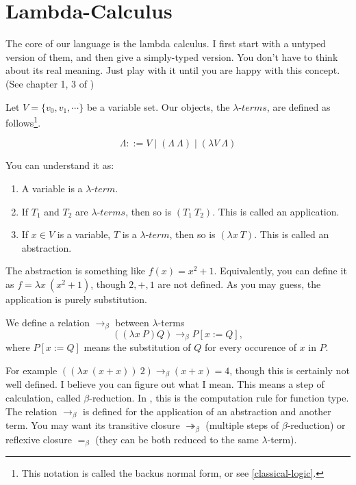 \section{Lambda-Calculus}
The core of our language is the lambda calculus. I first start with a
untyped version of them, and then give a simply-typed version. You don't
have to think about its real meaning. Just play with it until you are
happy with this concept. (See chapter 1, 3 of \cite{Curry-Howard})

Let 
$V=\{v_0, v_1, \cdots\}$ be a variable set. Our objects, the 
$\lambda$-$terms$, are defined as follows\footnote{This notation is
called the backus normal form, or see \autoref{classical-logic}.}. 

\begin{definition}\label{lambda-term}
    $$\Lambda ::= V \mid (\Lambda\ \Lambda) \mid (\lambda V\ \Lambda)$$
\end{definition}

You can understand it as:
\begin{enumerate}
    \item A variable is a $\lambda$-$term$.
    \item If $T_1$ and $T_2$ are $\lambda$-$terms$, then so is $(T_1\ T_2)$.
    This is called an application.
    \item If $x\in V$ is a variable, $T$ is a $\lambda$-$term$, then so
    is $(\lambda x\ T)$. This is called an abstraction. 
\end{enumerate}

The abstraction is something like $f(x) = x^2 + 1$. Equivalently, you
can define it as $f=\lambda x\ (x^2+1)$, though $2,+,1$ are not defined.
As you may guess, the application is purely substitution.

\begin{definition}\label{beta-reduction}
    We define a relation $\to_\beta$ between $\lambda$-terms
    $$((\lambda x\ P) Q) \to_\beta P[x:=Q],$$ where $P[x:=Q]$ means the 
    substitution of $Q$ for every occurence of $x$ in $P$. 
\end{definition}

For example $((\lambda x\ (x+x))\ 2)\to_\beta(x+x) = 4$, though
this is certainly not well defined. I believe you can figure out what
I mean. This means a step of calculation, called $\beta$-reduction.
In \cite{homotopy-type-theory}, this is the computation rule for function
type. The relation $\to_\beta$ is defined for the application of an 
abstraction and another term. You may want its transitive closure 
$\twoheadrightarrow_\beta$ (multiple steps of $\beta$-reduction) or 
reflexive closure $=_\beta$ (they can be both reduced to the same
$\lambda$-term).

